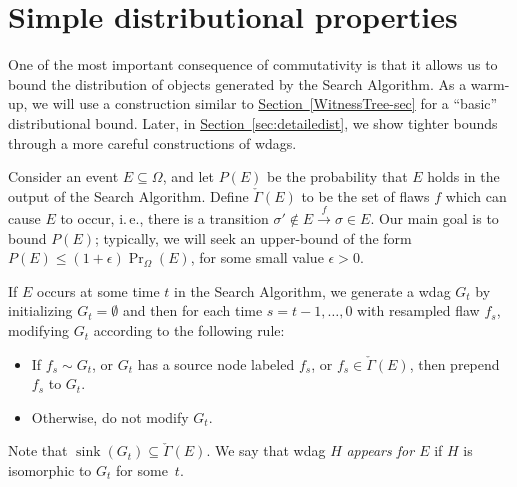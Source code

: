 \documentclass[11pt]{article}
\newcommand{\expref}[2]{\texorpdfstring{\hyperref[#2]{#1~\ref{#2}}}{#1~\ref{#2}}}
\newcommand{\ie}{i.\,e.}
\newcommand{\eps}{\epsilon}
\DeclareMathOperator{\sink}{sink}
\begin{document}
\section{Simple distributional  properties}
\label{distrib-sec}
One of the most important consequence of commutativity is that it allows us to bound the distribution of objects generated by the Search Algorithm.   As a warm-up, we will use a construction similar to \expref{Section}{WitnessTree-sec} for a ``basic'' distributional bound.  Later, in \expref{Section}{sec:detailedist}, we show tighter bounds through a more careful constructions of wdags. 

Consider an event $E \subseteq \Omega$, and let $P(E)$ be the probability that $E$ holds in the output of the Search Algorithm. Define $\check \Gamma(E)$ to be the set of flaws $f$ which can cause $E$ to occur, \ie, there is a transition $\sigma' \notin E \xrightarrow f \sigma \in E$.   Our main goal is to bound $P(E)$; typically, we will seek an upper-bound of the form $P(E) \leq (1 + \eps) \Pr_{\Omega}(E)$, for some small value $\eps > 0$.  


If $E$ occurs at some time $t$ in the Search Algorithm, we generate a wdag $G_t$ by initializing $G_t = \emptyset$ and then for each time $s = t-1, \dots, 0$ with resampled flaw $f_s$, modifying $G_t$ according to the following rule:
\begin{itemize}
\item If $f_s \sim G_t$, or $G_t$ has a source node labeled $f_s$, or $f_s \in \check \Gamma(E)$, then prepend $f_s$ to $G_t$. 
\item Otherwise, do not modify $G_t$. 
\end{itemize}

\noindent  %
Note that $\sink(G_t) \subseteq \check \Gamma(E)$. We say that wdag $H$ 
\emph{appears for $E$} if $H$ is isomorphic to $G_t$ %
%
%
for some~$t$.  %
\end{document}
